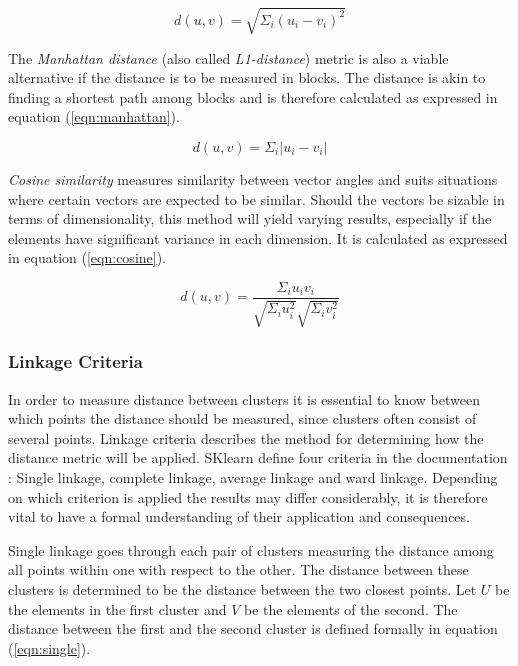 \begin{equation}
\label{eqn:euclid}
d(u, v) = \sqrt{\Sigma_i (u_i - v_i)^2} 
\end{equation}

The \textit{Manhattan distance} (also called \textit{L1-distance}) metric is also a viable alternative if the distance is to be measured in blocks. The distance is akin to finding a shortest path among blocks and is therefore calculated as expressed in equation (\ref{eqn:manhattan}).

\begin{equation}
\label{eqn:manhattan}
d(u, v) = \Sigma_i |u_i - v_i|
\end{equation}

\textit{Cosine similarity} measures similarity between vector angles and suits situations where certain vectors are expected to be similar. Should the vectors be sizable in terms of dimensionality, this method will yield varying results, especially if the elements have significant variance in each dimension. It is calculated as expressed in equation (\ref{eqn:cosine}).

\begin{equation}
\label{eqn:cosine}
d(u, v) = \frac{\Sigma_i u_iv_i}{\sqrt{\Sigma_i u_i^2}\sqrt{\Sigma_i v_i^2}}
\end{equation}

\subsubsection{Linkage Criteria}
In order to measure distance between clusters it is essential to know between which points the distance should be measured, since clusters often consist of several points. Linkage criteria describes the method for determining how the distance metric will be applied. SKlearn define four criteria in the documentation \cite{scikit}: Single linkage, complete linkage, average linkage and ward linkage. Depending on which criterion is applied the results may differ considerably, it is therefore vital to have a formal understanding of their application and consequences.

Single linkage goes through each pair of clusters measuring the distance among all points within one with respect to the other. The distance between these clusters is determined to be the distance between the two closest points. Let $U$ be the elements in the first cluster and $V$ be the elements of the second. The distance between the first and the second cluster is defined formally in equation (\ref{eqn:single}).

